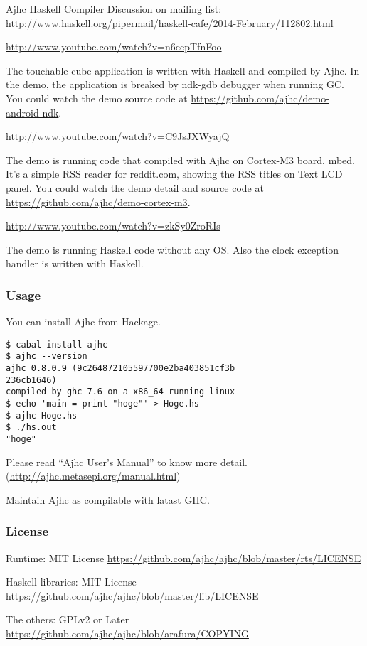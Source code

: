 \begin{hcarentry}{Ajhc Haskell Compiler}
Discussion on mailing list: \url{http://www.haskell.org/pipermail/haskell-cafe/2014-February/112802.html}

\noindent \url{http://www.youtube.com/watch?v=n6cepTfnFoo}

The touchable cube application is written with Haskell and compiled by Ajhc.
In the demo, the application is breaked by ndk-gdb debugger when running GC.
You could watch the demo source code at \url{https://github.com/ajhc/demo-android-ndk}.

\Separate

\noindent \url{http://www.youtube.com/watch?v=C9JsJXWyajQ}

The demo is running code that compiled with Ajhc on Cortex-M3 board, mbed. It's a simple RSS reader for reddit.com, showing the RSS titles on Text LCD panel. You could watch the demo detail and source code at \url{https://github.com/ajhc/demo-cortex-m3}.

\Separate

\noindent \url{http://www.youtube.com/watch?v=zkSy0ZroRIs}

The demo is running Haskell code without any OS.
Also the clock exception handler is written with Haskell.

\subsubsection*{Usage}

You can install Ajhc from Hackage.

\begin{verbatim}
$ cabal install ajhc
$ ajhc --version
ajhc 0.8.0.9 (9c264872105597700e2ba403851cf3b
236cb1646)
compiled by ghc-7.6 on a x86_64 running linux
$ echo 'main = print "hoge"' > Hoge.hs
$ ajhc Hoge.hs
$ ./hs.out
"hoge"
\end{verbatim}

Please read ``Ajhc User's Manual'' to know more detail. (\url{http://ajhc.metasepi.org/manual.html})

\FuturePlans

Maintain Ajhc as compilable with latast GHC.

\subsubsection*{License}

\begin{compactitem}
  \item Runtime: MIT License \url{https://github.com/ajhc/ajhc/blob/master/rts/LICENSE}
  \item Haskell libraries: MIT License \url{https://github.com/ajhc/ajhc/blob/master/lib/LICENSE}
  \item The others: GPLv2 or Later \url{https://github.com/ajhc/ajhc/blob/arafura/COPYING}
\end{compactitem}


\end{hcarentry}
